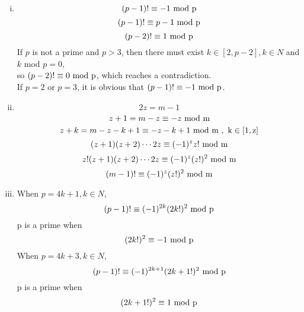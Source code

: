 \documentclass{article}
\begin{document}
\section{}
\begin{enumerate}[i)]
\item
$$(p-1)!\equiv -1\ \rm{mod} \ p$$
$$(p-1)!\equiv p-1\ \rm{mod} \ p$$
$$(p-2)!\equiv 1\ \rm{mod} \ p$$
If $p$ is not a prime and $p>3$, then there must exist $k\in[2,p-2],k\in N$ and $k$ mod $p=0$,\\
so $(p-2)!\equiv 0\ \rm{mod} \ p$, which reaches a contradiction.\\
If $p=2$ or $p=3$, it is obvious that $(p-1)!\equiv -1\ \rm{mod} \ p$.
\item
$$2z=m-1$$
$$z+1=m-z\equiv-z\ \rm{mod}\ m$$
$$z+k=m-z-k+1\equiv-z-k+1\ \rm{mod}\ m\ ,\ k\in[1,z]$$
$$(z+1)(z+2)\cdots2z\equiv(-1)^zz!\ \rm{mod}\ m$$
$$z!(z+1)(z+2)\cdots2z\equiv(-1)^z(z!)^2\ \rm{mod}\ m$$
$$(m-1)!\equiv(-1)^z(z!)^2\ \rm{mod}\ m$$
\item
When $p=4k+1,k\in N$,
$$(p-1)!\equiv(-1)^{2k}(2k!)^2\ \rm{mod}\ p$$
p is a prime when
$$(2k!)^2\equiv-1\ \rm{mod}\ p$$
When $p=4k+3,k\in N$,
$$(p-1)!\equiv(-1)^{2k+1}(2k+1!)^2\ \rm{mod}\ p$$
p is a prime when
$$(2k+1!)^2\equiv1\ \rm{mod}\ p$$

\end{enumerate}
\end{document}
